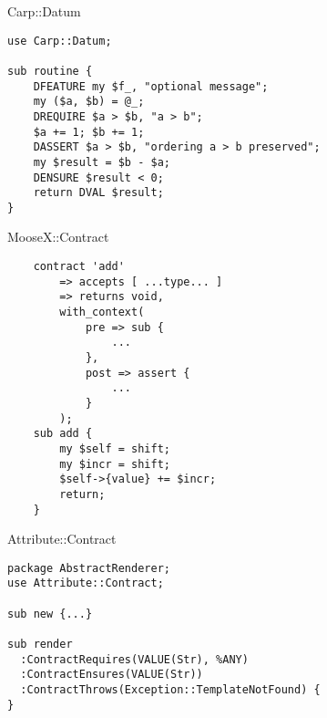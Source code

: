 \documentclass[14pt]{beamer}
\begin{document}
\begin{frame}
    \begin{center}
        Carp::Datum
    \end{center}
\end{frame}

\begin{frame}[fragile]
    \begin{lstlisting}
use Carp::Datum;

sub routine {
    DFEATURE my $f_, "optional message";
    my ($a, $b) = @_;
    DREQUIRE $a > $b, "a > b";
    $a += 1; $b += 1;
    DASSERT $a > $b, "ordering a > b preserved";
    my $result = $b - $a;
    DENSURE $result < 0;
    return DVAL $result;
}
    \end{lstlisting}
\end{frame}

\begin{frame}
    \begin{center}
        MooseX::Contract
    \end{center}
\end{frame}

\begin{frame}[fragile]
    \begin{lstlisting}
    contract 'add'
        => accepts [ ...type... ]
        => returns void,
        with_context(
            pre => sub {
                ...
            },
            post => assert {
                ...
            }
        );
    sub add {
        my $self = shift;
        my $incr = shift;
        $self->{value} += $incr;
        return;
    }
    \end{lstlisting}
\end{frame}

\begin{frame}
    \begin{center}
        Attribute::Contract
    \end{center}
\end{frame}

\begin{frame}[fragile]
    \begin{lstlisting}
package AbstractRenderer;
use Attribute::Contract;

sub new {...}

sub render
  :ContractRequires(VALUE(Str), %ANY)
  :ContractEnsures(VALUE(Str))
  :ContractThrows(Exception::TemplateNotFound) {
}
    \end{lstlisting}
\end{frame}
\end{document}
